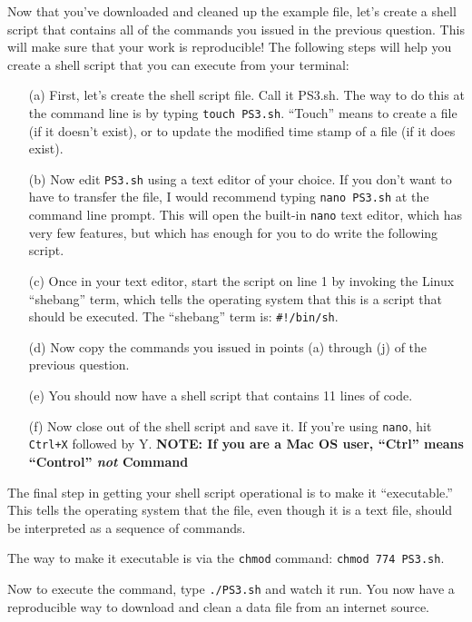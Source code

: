\documentclass[12pt,english]{exam}
\begin{document}
\begin{questions}
\question Now that you've downloaded and cleaned up the example file, let's create a shell script that contains all of the commands you issued in the previous question. This will make sure that your work is reproducible! The following steps will help you create a shell script that you can execute from your terminal:
\begin{itemize}
	\item[(a)] First, let's create the shell script file. Call it PS3.sh. The way to do this at the command line is by typing \texttt{touch PS3.sh}. ``Touch'' means to create a file (if it doesn't exist), or to update the modified time stamp of a file (if it does exist).
	\item[(b)] Now edit \texttt{PS3.sh} using a text editor of your choice. If you don't want to have to transfer the file, I would recommend typing \texttt{nano PS3.sh} at the command line prompt. This will open the built-in \texttt{nano} text editor, which has very few features, but which has enough for you to do write the following script.
	\item[(c)] Once in your text editor, start the script on line 1 by invoking the Linux ``shebang'' term, which tells the operating system that this is a script that should be executed. The ``shebang'' term is: \texttt{\#!/bin/sh}.
	\item[(d)] Now copy the commands you issued in points (a) through (j) of the previous question.
	\item[(e)] You should now have a shell script that contains 11 lines of code.
	\item[(f)] Now close out of the shell script and save it. If you're using \texttt{nano}, hit \texttt{Ctrl+X} followed by {Y}. \textbf{NOTE: If you are a Mac OS user, ``Ctrl'' means ``Control'' \emph{not} Command}
\end{itemize}

The final step in getting your shell script operational is to make it ``executable.'' This tells the operating system that the file, even though it is a text file, should be interpreted as a sequence of commands.

The way to make it executable is via the \texttt{chmod} command: \texttt{chmod 774 PS3.sh}.

Now to execute the command, type \texttt{./PS3.sh} and watch it run. You now have a reproducible way to download and clean a data file from an internet source.


\end{questions}
\end{document}
